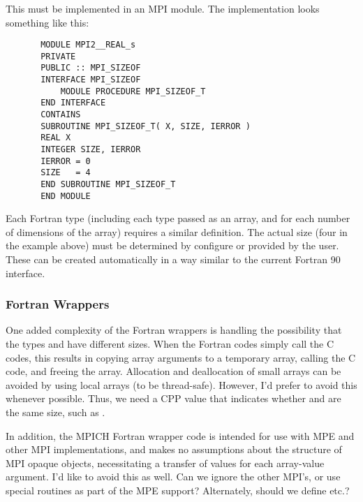 \documentclass{article}
\begin{document}
\subsubsection{}
This must be implemented in an MPI module.  The implementation looks something
like this:
\begin{verbatim}
       MODULE MPI2__REAL_s
       PRIVATE
       PUBLIC :: MPI_SIZEOF
       INTERFACE MPI_SIZEOF
           MODULE PROCEDURE MPI_SIZEOF_T
       END INTERFACE
       CONTAINS
       SUBROUTINE MPI_SIZEOF_T( X, SIZE, IERROR )
       REAL X
       INTEGER SIZE, IERROR
       IERROR = 0
       SIZE   = 4
       END SUBROUTINE MPI_SIZEOF_T       
       END MODULE
\end{verbatim}
Each Fortran type (including each type passed as an array, and for
each number of dimensions of the array) requires a similar
definition.  The actual size (four in the example above) must be determined by
configure or provided by the user.
These can be created automatically in a way similar to the current
Fortran 90 interface.

\subsubsection{Fortran Wrappers}
One added complexity of the Fortran wrappers is handling the possibility that
the types  and  have different sizes.  When the
Fortran codes simply call the C codes, this results in copying array arguments
to a temporary array, calling the C code, and freeing the array.  Allocation
and deallocation of small arrays can be avoided by using local arrays (to be
thread-safe).  However, I'd prefer to avoid this whenever possible.  Thus, we
need a CPP value that indicates whether  and  are the
same size, such as .

In addition, the MPICH Fortran wrapper code is intended for use with MPE and
other MPI implementations, and makes no assumptions about the structure of
MPI opaque objects, necessitating a transfer of values for each array-value
argument.  I'd like to avoid this as well.  Can we ignore the other MPI's, or
use special routines as part of the MPE support?  Alternately, should we
define  etc.?
\end{document}
